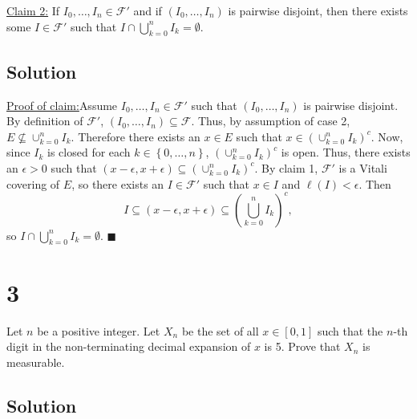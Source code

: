 \documentclass[12pt]{article}
\newenvironment{claimproof}[1]{\par\noindent\underline{Proof of claim:}\space#1}{\hfill $\blacksquare$}
\begin{document}
\underline{Claim 2:} If $I_{0}, \hdots, I_{n} \in \mathcal{F}'$ and if $\left( I_{0}, \hdots, I_{n} \right)$ is pairwise disjoint, then there exists
some $I \in \mathcal{F}'$ such that $I \cap \bigcup_{k=0}^{n}I_{k} = \emptyset$.

\subsection*{Solution}

\begin{claimproof}
Assume $I_{0}, \hdots, I_{n} \in \mathcal{F}'$ such that $(I_{0}, \hdots, I_{n})$ is pairwise disjoint. By definition of $\mathcal{F}'$, $(I_{0}, \hdots, I_{n}) \subseteq
\mathcal{F}$. Thus, by assumption of case 2, $E \nsubseteq \cup_{k=0}^{n} I_{k}$. Therefore there exists an $x \in E$ such that $x \in \left(
\cup_{k=0}^{n}I_{k} \right)^{c}$. Now, since $I_{k}$ is closed for each $k \in \left\{ 0, \hdots, n \right\}$, $\left( \cup_{k=0}^{n}I_{k}
\right)^{c}$ is open. Thus, there exists an $\epsilon > 0$ such that $(x - \epsilon, x + \epsilon) \subseteq \left( \cup_{k=0}^{n}I_k \right)^{c}$. By
claim 1, $\mathcal{F}'$ is a Vitali covering of $E$, so there exists an $I \in \mathcal{F}'$ such that $x \in I$ and $\ell(I) < \epsilon$. Then 
\[ I \subseteq (x - \epsilon, x + \epsilon) \subseteq \left( \bigcup_{k=0}^{n}I_{k} \right)^{c}, \]
so $I \cap \bigcup_{k=0}^{n}I_{k} = \emptyset$.
\end{claimproof}


\newpage
\section*{3}
Let $n$ be a positive integer. Let $X_{n}$ be the set of all $x \in [0,1]$ such that the $n$-th digit in the non-terminating decimal expansion of $x$
is 5. Prove that $X_{n}$ is measurable.

\subsection*{Solution}
\end{document}

